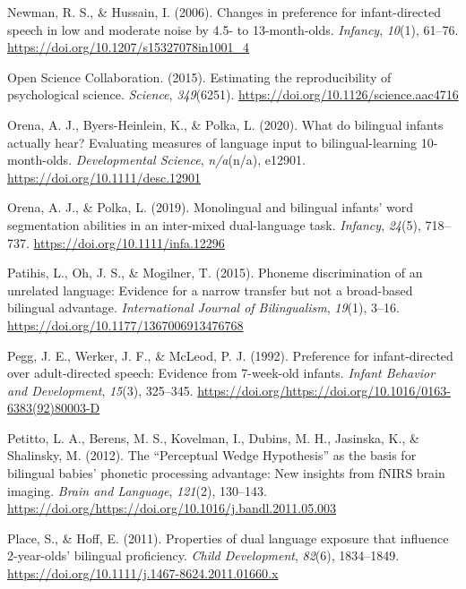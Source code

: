 \documentclass[
  english,
  ,man,floatsintext]{apa6}
\begin{document}
\leavevmode\hypertarget{ref-newman_2006}{}%
Newman, R. S., \& Hussain, I. (2006). Changes in preference for infant-directed speech in low and moderate noise by 4.5- to 13-month-olds. \emph{Infancy}, \emph{10}(1), 61--76. \url{https://doi.org/10.1207/s15327078in1001_4}

\leavevmode\hypertarget{ref-open_science_collab_2015}{}%
Open Science Collaboration. (2015). Estimating the reproducibility of psychological science. \emph{Science}, \emph{349}(6251). \url{https://doi.org/10.1126/science.aac4716}

\leavevmode\hypertarget{ref-orena_2020}{}%
Orena, A. J., Byers-Heinlein, K., \& Polka, L. (2020). What do bilingual infants actually hear? Evaluating measures of language input to bilingual-learning 10-month-olds. \emph{Developmental Science}, \emph{n/a}(n/a), e12901. \url{https://doi.org/10.1111/desc.12901}

\leavevmode\hypertarget{ref-orena_polka_2019}{}%
Orena, A. J., \& Polka, L. (2019). Monolingual and bilingual infants' word segmentation abilities in an inter-mixed dual-language task. \emph{Infancy}, \emph{24}(5), 718--737. \url{https://doi.org/10.1111/infa.12296}

\leavevmode\hypertarget{ref-patihis_2015}{}%
Patihis, L., Oh, J. S., \& Mogilner, T. (2015). Phoneme discrimination of an unrelated language: Evidence for a narrow transfer but not a broad-based bilingual advantage. \emph{International Journal of Bilingualism}, \emph{19}(1), 3--16. \url{https://doi.org/10.1177/1367006913476768}

\leavevmode\hypertarget{ref-pegg_1992}{}%
Pegg, J. E., Werker, J. F., \& McLeod, P. J. (1992). Preference for infant-directed over adult-directed speech: Evidence from 7-week-old infants. \emph{Infant Behavior and Development}, \emph{15}(3), 325--345. \url{https://doi.org/https://doi.org/10.1016/0163-6383(92)80003-D}

\leavevmode\hypertarget{ref-petitto_2012}{}%
Petitto, L. A., Berens, M. S., Kovelman, I., Dubins, M. H., Jasinska, K., \& Shalinsky, M. (2012). The ``Perceptual Wedge Hypothesis'' as the basis for bilingual babies' phonetic processing advantage: New insights from fNIRS brain imaging. \emph{Brain and Language}, \emph{121}(2), 130--143. \url{https://doi.org/https://doi.org/10.1016/j.bandl.2011.05.003}

\leavevmode\hypertarget{ref-place_2011}{}%
Place, S., \& Hoff, E. (2011). Properties of dual language exposure that influence 2-year-olds' bilingual proficiency. \emph{Child Development}, \emph{82}(6), 1834--1849. \url{https://doi.org/10.1111/j.1467-8624.2011.01660.x}
\end{document}
